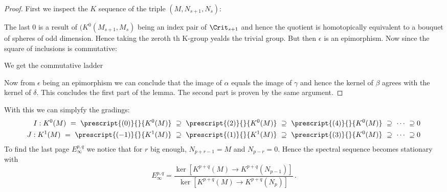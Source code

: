 	\begin{proof}
		First we inspect the $K$ sequence of the triple $(M,N_{s+1},N_s)$:
		\begin{center}
		\end{center}The last $0$ is a result of $(K^0(M_{s+1},M_{s})$ being an index pair of $\Crit_{s+1}$ and hence the quotient is homotopically equivalent to a bouquet of spheres of odd dimension. Hence taking the zeroth th K-group yealds the trivial group. But then $\epsilon$ is an epimorphism. Now since the square of inclusions is commutative:
		\begin{center}
		\end{center}
		We get the commutative ladder
		\begin{center}
		\end{center} Now from $\epsilon$ being an epimorphism we can conclude that the image of $\alpha$ equals the image of $\gamma$ and hence the kernel of $\beta$ agrees with the kernel of $\delta$. This concludes the first part of the lemma. The second part is proven by the same argument. 
	\end{proof}
	With this we can simplyfy the gradings:
	\begin{align*}
		I: 	K^0(M)~=~\prescript{(0)}{}{K^0(M)}~\supseteq~\prescript{(2)}{}{K^0(M)}~\supseteq~\prescript{(4)}{}{K^0(M)}~\supseteq ~\cdots~\supseteq 0\\ 
		J: K^1(M)~=~\prescript{(-1)}{}{K^1(M)}~\supseteq~\prescript{(1)}{}{K^1(M)}~\supseteq~\prescript{(3)}{}{K^0(M)}~\supseteq ~\cdots~\supseteq 0
	\end{align*}
	To find the last page $E^{p,q}_{\infty}$ we notice that for $r$ big enough, $N_{p+r-1}=M$ and $N_{p-r}=0$. Hence the spectral sequence becomes stationary with 
	\begin{equation*}
		E^{p,q}_{\infty}=\frac{\ker[K^{p+q}(M)\to K^{p+q}(N_{p-1})]}{\ker[K^{p+q}(M)\to K^{p+q}(N_{p})]}\,.
	\end{equation*}
	
	
	
